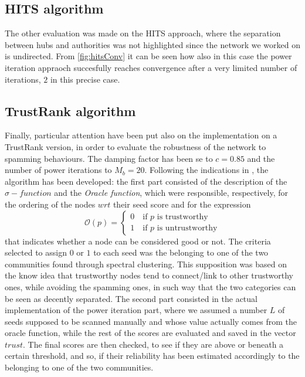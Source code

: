 \documentclass[12pt,a4paper]{article}
\begin{document}
\subsection*{HITS algorithm}
The other evaluation was made on the HITS approach, where the separation between hubs and authorities was not highlighted since the network we worked on is undirected. From \autoref{fig:hitsConv} it can be seen how also in this case the power iteration appraoch succesfully reaches convergence after a very limited number of iterations, $2$ in this precise case.
\subsection*{TrustRank algorithm}
Finally, particular attention have been put also on the implementation on a TrustRank version, in order to evaluate the robustness of the network to spamming behaviours. The damping factor has been se to $c = 0.85$ and the number of power iterations to $M_b = 20$. Following the indications in \cite{Garcia-molina2004}, the algorithm has been developed: the first part consisted of the description of the $\sigma-function$ and the \textit{Oracle function}, which were responsible, respectively, for the ordering of the nodes $wrt$ their seed score and for the expression
\begin{equation}
  \mathcal{O}(p) =
  \begin{cases}
    0 \quad \text{if $p$ is trustworthy}\\
    1 \quad \text{if $p$ is untrustworthy}
  \end{cases}
\end{equation}
that indicates whether a node can be considered good or not. The criteria selected to assign $0$ or $1$ to each seed was the belonging to one of the two communities found through spectral clustering. This supposition was based on the know idea that trustworthy nodes tend to connect/link to other trustworthy ones, while avoiding the spamming ones, in such way that the two categories can be seen as decently separated. The second part consisted in the actual implementation of the power iteration part, where we assumed a number $L$ of seeds supposed to be scanned manually and whose value actually comes from the oracle function, while the rest of the scores are evaluated and saved in the vector $trust$. The final scores are then checked, to see if they are above or beneath a certain threshold, and so, if their reliability has been estimated accordingly to the belonging to one of the two communities.
\end{document}
